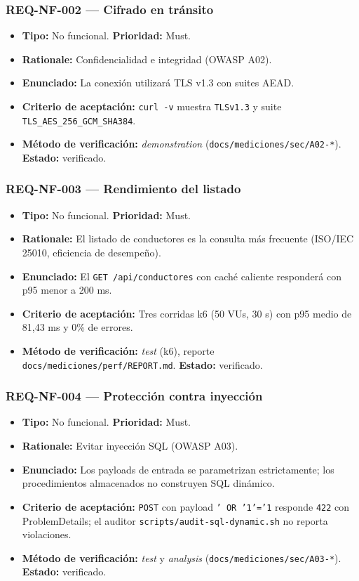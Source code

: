 \documentclass[12pt,a4paper]{article}
\begin{document}
\subsubsection{REQ-NF-002 — Cifrado en tránsito}
\begin{itemize}
  \item \textbf{Tipo:} No funcional. \textbf{Prioridad:} Must.
  \item \textbf{Rationale:} Confidencialidad e integridad (OWASP A02).
  \item \textbf{Enunciado:} La conexión utilizará TLS v1.3 con suites AEAD.
  \item \textbf{Criterio de aceptación:} \texttt{curl -v} muestra \texttt{TLSv1.3} y suite
  \texttt{TLS\_AES\_256\_GCM\_SHA384}.
  \item \textbf{Método de verificación:} \textit{demonstration}
  (\texttt{docs/mediciones/sec/A02-*}). \textbf{Estado:} verificado.
\end{itemize}

\subsubsection{REQ-NF-003 — Rendimiento del listado}
\begin{itemize}
  \item \textbf{Tipo:} No funcional. \textbf{Prioridad:} Must.
  \item \textbf{Rationale:} El listado de conductores es la consulta más frecuente (ISO/IEC
  25010, eficiencia de desempeño).
  \item \textbf{Enunciado:} El \texttt{GET /api/conductores} con caché caliente responderá
  con p95 menor a 200 ms.
  \item \textbf{Criterio de aceptación:} Tres corridas k6 (50 VUs, 30 s) con p95 medio de
  81,43 ms y 0\% de errores.
  \item \textbf{Método de verificación:} \textit{test} (k6), reporte
  \texttt{docs/mediciones/perf/REPORT.md}. \textbf{Estado:} verificado.
\end{itemize}

\subsubsection{REQ-NF-004 — Protección contra inyección}
\begin{itemize}
  \item \textbf{Tipo:} No funcional. \textbf{Prioridad:} Must.
  \item \textbf{Rationale:} Evitar inyección SQL (OWASP A03).
  \item \textbf{Enunciado:} Los payloads de entrada se parametrizan estrictamente; los
  procedimientos almacenados no construyen SQL dinámico.
  \item \textbf{Criterio de aceptación:} \texttt{POST} con payload \texttt{' OR '1'='1}
  responde \texttt{422} con ProblemDetails; el auditor
  \texttt{scripts/audit-sql-dynamic.sh} no reporta violaciones.
  \item \textbf{Método de verificación:} \textit{test} y \textit{analysis}
  (\texttt{docs/mediciones/sec/A03-*}). \textbf{Estado:} verificado.
\end{itemize}
\end{document}
